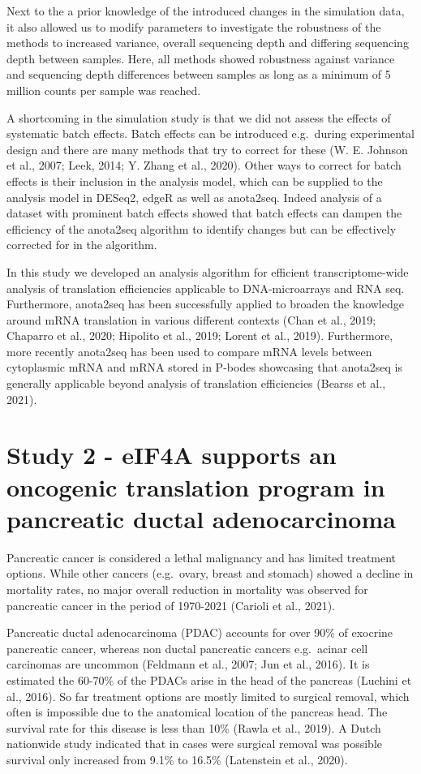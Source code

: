 \documentclass[12pt,openany]{book}
\begin{document}
Next to the a prior knowledge of the introduced changes in the
simulation data, it also allowed us to modify parameters to investigate
the robustness of the methods to increased variance, overall sequencing
depth and differing sequencing depth between samples. Here, all methods
showed robustness against variance and sequencing depth differences
between samples as long as a minimum of 5 million counts per sample was
reached.

A shortcoming in the simulation study is that we did not assess the
effects of systematic batch effects. Batch effects can be introduced
e.g.~during experimental design and there are many methods that try to
correct for these (W. E. Johnson et al., 2007; Leek, 2014; Y. Zhang et
al., 2020). Other ways to correct for batch effects is their inclusion
in the analysis model, which can be supplied to the analysis model in
DESeq2, edgeR as well as anota2seq. Indeed analysis of a dataset with
prominent batch effects showed that batch effects can dampen the
efficiency of the anota2seq algorithm to identify changes but can be
effectively corrected for in the algorithm.

In this study we developed an analysis algorithm for efficient
transcriptome-wide analysis of translation efficiencies applicable to
DNA-microarrays and RNA seq. Furthermore, anota2seq has been
successfully applied to broaden the knowledge around mRNA translation in
various different contexts (Chan et al., 2019; Chaparro et al., 2020;
Hipolito et al., 2019; Lorent et al., 2019). Furthermore, more recently
anota2seq has been used to compare mRNA levels between cytoplasmic mRNA
and mRNA stored in P-bodes showcasing that anota2seq is generally
applicable beyond analysis of translation efficiencies (Bearss et al.,
2021). \newline
\section{Study 2 - eIF4A supports an oncogenic translation program in pancreatic ductal adenocarcinoma}

Pancreatic cancer is considered a lethal malignancy and has limited
treatment options. While other cancers (e.g.~ovary, breast and stomach)
showed a decline in mortality rates, no major overall reduction in
mortality was observed for pancreatic cancer in the period of 1970-2021
(Carioli et al., 2021).

Pancreatic ductal adenocarcinoma (PDAC) accounts for over 90\% of
exocrine pancreatic cancer, whereas non ductal pancreatic cancers
e.g.~acinar cell carcinomas are uncommon (Feldmann et al., 2007; Jun et
al., 2016). It is estimated the 60-70\% of the PDACs arise in the head
of the pancreas (Luchini et al., 2016). So far treatment options are
mostly limited to surgical removal, which often is impossible due to the
anatomical location of the pancreas head. The survival rate for this
disease is less than 10\% (Rawla et al., 2019). A Dutch nationwide study
indicated that in cases were surgical removal was possible survival only
increased from 9.1\% to 16.5\% (Latenstein et al., 2020).
\end{document}
